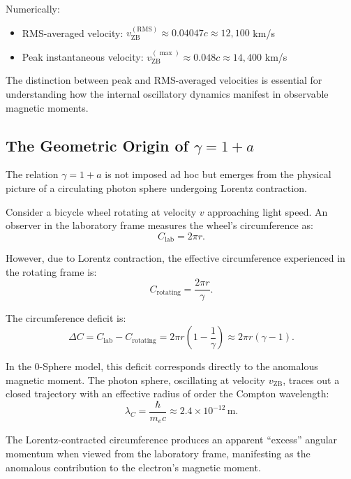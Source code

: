 \documentclass[12pt,letterpaper]{article}
\begin{document}
Numerically:
\begin{itemize}
\item RMS-averaged velocity: $v_{\mathrm{ZB}}^{(\mathrm{RMS})} \approx 0.04047c \approx 12{,}100$ km/s
\item Peak instantaneous velocity: $v_{\mathrm{ZB}}^{(\max)} \approx 0.048c \approx 14{,}400$ km/s
\end{itemize}

The distinction between peak and RMS-averaged velocities is essential for understanding how the internal oscillatory dynamics manifest in observable magnetic moments.

\subsection{The Geometric Origin of $\gamma = 1 + a$}

The relation $\gamma = 1 + a$ is not imposed ad hoc but emerges from the physical picture of a circulating photon sphere undergoing Lorentz contraction.

Consider a bicycle wheel rotating at velocity $v$ approaching light speed. An observer in the laboratory frame measures the wheel's circumference as:
\begin{equation}
C_{\mathrm{lab}} = 2\pi r.
\end{equation}

However, due to Lorentz contraction, the effective circumference experienced in the rotating frame is:
\begin{equation}
C_{\mathrm{rotating}} = \frac{2\pi r}{\gamma}.
\end{equation}

The circumference deficit is:
\begin{equation}
\Delta C = C_{\mathrm{lab}} - C_{\mathrm{rotating}} = 2\pi r \left(1 - \frac{1}{\gamma}\right) \approx 2\pi r (\gamma - 1).
\end{equation}

In the 0-Sphere model, this deficit corresponds directly to the anomalous magnetic moment. The photon sphere, oscillating at velocity $v_{\mathrm{ZB}}$, traces out a closed trajectory with an effective radius of order the Compton wavelength:
\begin{equation}
\lambda_C = \frac{\hbar}{m_e c} \approx 2.4 \times 10^{-12} \, \mathrm{m}.
\end{equation}

The Lorentz-contracted circumference produces an apparent ``excess'' angular momentum when viewed from the laboratory frame, manifesting as the anomalous contribution to the electron's magnetic moment.
\end{document}
